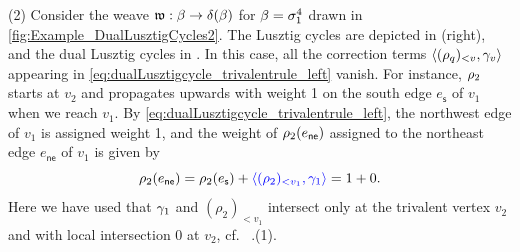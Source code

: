 \begin{example}
\noindent (2) Consider the weave $\mathfrak{w}:\beta\to\delta(\beta)$ for $\beta=\sigma_1^4$ drawn in \cref{fig:Example_DualLusztigCycles2}. The Lusztig cycles are depicted in  (right), and the dual Lusztig cycles in . In this case, all the correction terms $\langle (\rho_q)_{<v},\gamma_v\rangle$ appearing in \eqref{eq:dualLusztigcycle_trivalentrule_left} vanish. For instance, $\rho_2$ starts at $v_2$ and propagates upwards with weight 1 on the south edge $e_\mathsf{s}$ of $v_1$ when we reach $v_1$. By \eqref{eq:dualLusztigcycle_trivalentrule_left}, the northwest edge of $v_1$ is assigned weight 1, and the weight of $\rho_2(e_\mathsf{ne})$ assigned to the northeast edge $e_\mathsf{ne}$ of $v_1$ is given by
$$\rho_2(e_\mathsf{ne})=\rho_2(e_\mathsf{s})+\textcolor{blue}{\langle (\rho_2)_{<v_1},\gamma_1\rangle}=1+0.$$
Here we have used that $\gamma_1$ and $(\rho_2)_{<v_1}$ intersect only at the trivalent vertex $v_2$ and with local intersection 0 at $v_2$, cf.~ .(1).\\


\end{example}
